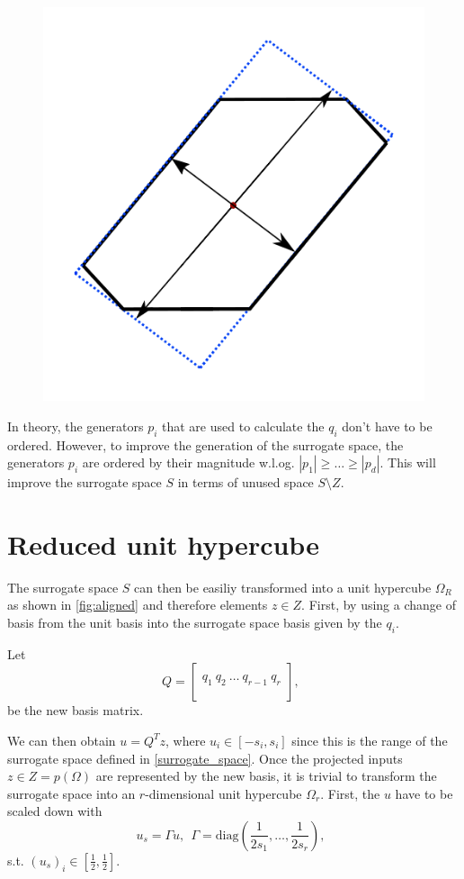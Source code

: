 \documentclass[
  a4paper,  %
  twoside,  %
  bibliography=totoc,
  headsepline,
  cleardoublepage=empty,
  parskip=half,
  draft=false
]{scrbook}
\begin{document}
\begin{figure}[H]
\centering
  \includegraphics[width=0.4\linewidth]{graphics/s}
  \label{fig:surrogate_space}
\end{figure}

In theory, the generators $p_i$ that are used to calculate the $q_i$ don't have to be ordered.
However, to improve the generation of the surrogate space, the generators $p_i$ are ordered by their magnitude w.l.og. $|p_1|\geq \dots \geq |p_d|$.
This will improve the surrogate space $S$ in terms of unused space $S \setminus Z$.


\section{Reduced unit hypercube}

The surrogate space $S$ can then be easiliy transformed into a unit hypercube $\Omega_R$ as shown in \ref{fig:aligned} and therefore elements $z \in Z$.
First, by using a change of basis from the unit basis into the surrogate space basis given by the $q_i$.

Let
\begin{equation}
Q=\begin{bmatrix}
  \\
    q_1 ~ q_2 ~ \dots ~q_{r-1} ~ q_r\\
    \\
  \end{bmatrix}
  , ~~
\label{alignment}
\end{equation}
be the new basis matrix.

We can then obtain $u=Q^T z$, where $u_i \in [-s_i,s_i]$ since this is the range of the surrogate space defined in \ref{surrogate_space}.
Once the projected inputs $z \in Z=p(\Omega)$ are represented by the new basis, it is trivial to transform the surrogate space into an $r$-dimensional unit hypercube $\Omega_r$.
First, the $u$ have to be scaled down with
\begin{equation}
u_s=\Gamma u, ~~ \Gamma=\text{diag}(\frac{1}{2 s_1}, \dots, \frac{1}{2 s_r}), ~~
\label{alignment}
\end{equation}
s.t. $(u_s)_i \in [\frac{1}{2},\frac{1}{2}]$.
\end{document}
